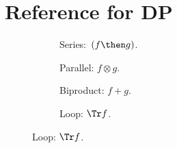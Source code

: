 
\section{Reference for DP}

\begin{figure}[h!]
    \centering
    \begin{subfigure}{0.2\textwidth}
        \centering
        \caption{Series:~$(f \then g)$.}
    \end{subfigure}
    \hspace{10mm} %
    \begin{subfigure}{0.2\textwidth}
        \centering
        \caption{Parallel: $f \otimes g$.}
    \end{subfigure}
    \hspace{10mm} %
    \begin{subfigure}{0.2\textwidth}
        \centering
        \caption{Biproduct: $f + g$.}
    \end{subfigure}
    \hspace{10mm} %
    \begin{subfigure}{0.2\textwidth}
        \centering
        \caption{Loop: $\Tr f$.}
    \end{subfigure}
    \label{fig:diagrams}
\end{figure}

